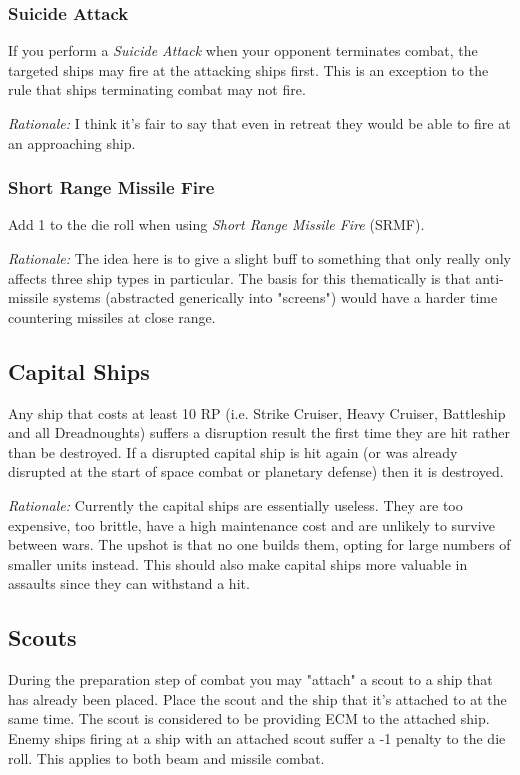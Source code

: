 \subsubsection{Suicide Attack}

If you perform a \textit{Suicide Attack} when your opponent terminates combat, the targeted ships may fire at the attacking ships first. This is an exception to the rule that ships terminating combat may not fire.

\textit{Rationale:} I think it's fair to say that even in retreat they would be able to fire at an approaching ship.

\subsubsection{Short Range Missile Fire}

Add 1 to the die roll when using \textit{Short Range Missile Fire} (SRMF).

\textit{Rationale:} The idea here is to give a slight buff to something that only really only affects three ship types in particular. The basis for this thematically is that anti-missile systems (abstracted generically into "screens") would have a harder time countering missiles at close range.

\subsection{Capital Ships}

Any ship that costs at least 10 RP (i.e. Strike Cruiser, Heavy Cruiser, Battleship and all Dreadnoughts) suffers a disruption result the first time they are hit rather than be destroyed. If a disrupted capital ship is hit again (or was already disrupted at the start of space combat or planetary defense) then it is destroyed.

\textit{Rationale:} Currently the capital ships are essentially useless. They are too expensive, too brittle, have a high maintenance cost and are unlikely to survive between wars. The upshot is that no one builds them, opting for large numbers of smaller units instead. This should also make capital ships more valuable in assaults since they can withstand a hit.

\subsection{Scouts}

During the preparation step of combat you may "attach" a scout to a ship that has already been placed. Place the scout and the ship that it's attached to at the same time. The scout is considered to be providing ECM to the attached ship. Enemy ships firing at a ship with an attached scout suffer a -1 penalty to the die roll. This applies to both beam and missile combat.

